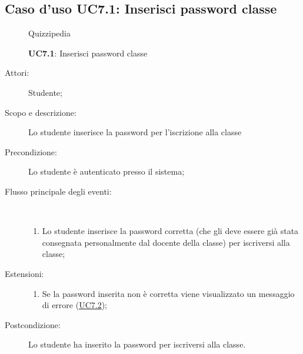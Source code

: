 \subsection{Caso d'uso UC7.1: Inserisci password classe}
	\begin{figure}[H]
		\centering
		\begin{resizedtikzpicture}{\textwidth}
		\begin{umlsystem}[x=0, fill=lightgray!20]{Quizzipedia}
		\end{umlsystem}
		\end{resizedtikzpicture}
		\caption{\textbf{UC7.1}: Inserisci password classe}
		\label{UC7.1}
	\end{figure}
\begin{description}
\item[Attori:] Studente;
\item[Scopo e descrizione:] Lo studente inserisce la password per l'iscrizione alla classe
      \item[Precondizione:] Lo studente è autenticato presso il sistema;

        \item[Flusso principale degli eventi:] \ 
 \begin{enumerate}
          \item Lo studente inserisce la password corretta (che gli deve essere già stata consegnata personalmente dal docente della classe) per iscriversi alla classe;

      \end{enumerate}
    \item[Estensioni:]
      \begin{enumerate}
          \item Se la password inserita non è corretta viene visualizzato un messaggio di errore (\hyperlink{UC7.2}{UC7.2});

      \end{enumerate}
    \item[Postcondizione:] Lo studente ha inserito la password per iscriversi alla classe.
  \end{description}
\hypertarget{UC7.2}{}

